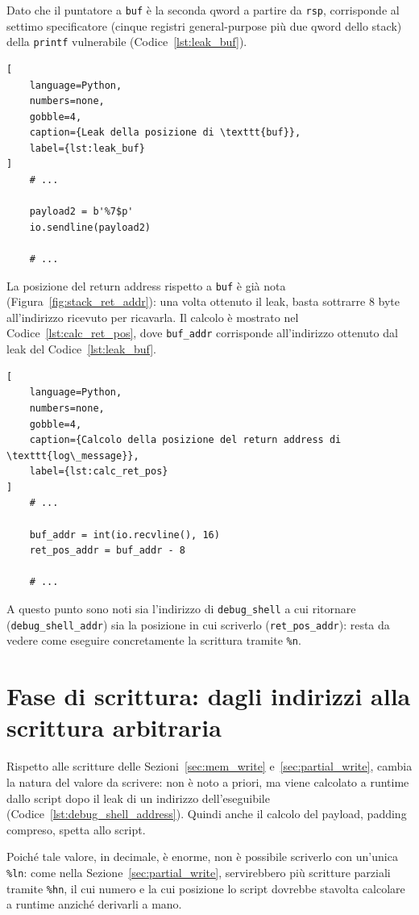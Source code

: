 Dato che il puntatore a \texttt{buf} è la seconda qword a partire da \texttt{rsp}, corrisponde al settimo specificatore (cinque registri general-purpose più due qword dello stack) della \texttt{printf} vulnerabile (Codice~\ref{lst:leak_buf}).
\begin{lstlisting}[
    language=Python,
    numbers=none,
    gobble=4,
    caption={Leak della posizione di \texttt{buf}},
    label={lst:leak_buf}
]
    # ...

    payload2 = b'%7$p'
    io.sendline(payload2)

    # ...
\end{lstlisting}

La posizione del return address rispetto a \texttt{buf} è già nota (Figura~\ref{fig:stack_ret_addr}): una volta ottenuto il leak, basta sottrarre 8 byte all'indirizzo ricevuto per ricavarla. Il calcolo è mostrato nel Codice~\ref{lst:calc_ret_pos}, dove \texttt{buf\_addr} corrisponde all'indirizzo ottenuto dal leak del Codice~\ref{lst:leak_buf}.
\begin{lstlisting}[
    language=Python,
    numbers=none,
    gobble=4,
    caption={Calcolo della posizione del return address di \texttt{log\_message}},
    label={lst:calc_ret_pos}
]
    # ...

    buf_addr = int(io.recvline(), 16)
    ret_pos_addr = buf_addr - 8

    # ...
\end{lstlisting}

A questo punto sono noti sia l'indirizzo di \texttt{debug\_shell} a cui ritornare (\texttt{debug\_shell\_addr}) sia la posizione in cui scriverlo (\texttt{ret\_pos\_addr}): resta da vedere come eseguire concretamente la scrittura tramite \texttt{\%n}.


\section{Fase di scrittura: dagli indirizzi alla scrittura arbitraria}\label{sec:write_phase}
Rispetto alle scritture delle Sezioni~\ref{sec:mem_write} e~\ref{sec:partial_write}, cambia la natura del valore da scrivere: non è noto a priori, ma viene calcolato a runtime dallo script dopo il leak di un indirizzo dell'eseguibile (Codice~\ref{lst:debug_shell_address}). Quindi anche il calcolo del payload, padding compreso, spetta allo script.

Poiché tale valore, in decimale, è enorme, non è possibile scriverlo con un'unica \texttt{\%ln}: come nella Sezione~\ref{sec:partial_write}, servirebbero più scritture parziali tramite \texttt{\%hn}, il cui numero e la cui posizione lo script dovrebbe stavolta calcolare a runtime anziché derivarli a mano.

